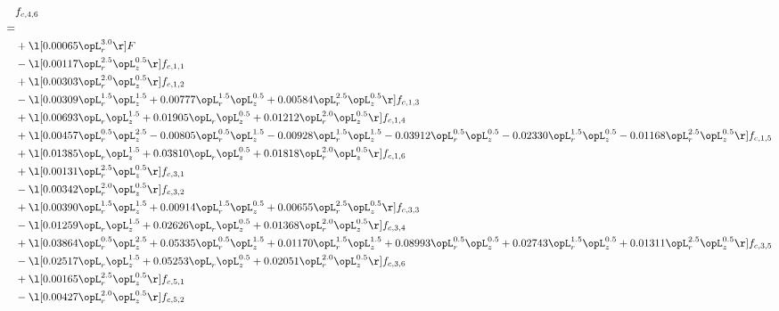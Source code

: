 \begin{alignat}{2} 
\label{eq:f_46_1} 
& f_{c,4,6} \nonumber \\ 
 = \\ 
& + \l[  0.00065 \opL_r^{3.0}  \r] F \nonumber \\ 
& - \l[  0.00117 \opL_r^{2.5} \opL_z^{0.5}  \r] f_{c,1,1} \nonumber \\ 
& + \l[  0.00303 \opL_r^{2.0} \opL_z^{0.5}  \r] f_{c,1,2} \nonumber \\ 
& - \l[  0.00309 \opL_r^{1.5} \opL_z^{1.5} +  0.00777 \opL_r^{1.5} \opL_z^{0.5} +  0.00584 \opL_r^{2.5} \opL_z^{0.5}  \r] f_{c,1,3} \nonumber \\ 
& + \l[  0.00693 \opL_r \opL_z^{1.5} +  0.01905 \opL_r \opL_z^{0.5} +  0.01212 \opL_r^{2.0} \opL_z^{0.5}  \r] f_{c,1,4} \nonumber \\ 
& + \l[  0.00457 \opL_r^{0.5} \opL_z^{2.5}   -0.00805 \opL_r^{0.5} \opL_z^{1.5}   -0.00928 \opL_r^{1.5} \opL_z^{1.5}   -0.03912 \opL_r^{0.5} \opL_z^{0.5}   -0.02330 \opL_r^{1.5} \opL_z^{0.5}   -0.01168 \opL_r^{2.5} \opL_z^{0.5}  \r] f_{c,1,5} \nonumber \\ 
& + \l[  0.01385 \opL_r \opL_z^{1.5} +  0.03810 \opL_r \opL_z^{0.5} +  0.01818 \opL_r^{2.0} \opL_z^{0.5}  \r] f_{c,1,6} \nonumber \\ 
& + \l[  0.00131 \opL_r^{2.5} \opL_z^{0.5}  \r] f_{c,3,1} \nonumber \\ 
& - \l[  0.00342 \opL_r^{2.0} \opL_z^{0.5}  \r] f_{c,3,2} \nonumber \\ 
& + \l[  0.00390 \opL_r^{1.5} \opL_z^{1.5} +  0.00914 \opL_r^{1.5} \opL_z^{0.5} +  0.00655 \opL_r^{2.5} \opL_z^{0.5}  \r] f_{c,3,3} \nonumber \\ 
& - \l[  0.01259 \opL_r \opL_z^{1.5} +  0.02626 \opL_r \opL_z^{0.5} +  0.01368 \opL_r^{2.0} \opL_z^{0.5}  \r] f_{c,3,4} \nonumber \\ 
& + \l[  0.03864 \opL_r^{0.5} \opL_z^{2.5} +  0.05335 \opL_r^{0.5} \opL_z^{1.5} +  0.01170 \opL_r^{1.5} \opL_z^{1.5} +  0.08993 \opL_r^{0.5} \opL_z^{0.5} +  0.02743 \opL_r^{1.5} \opL_z^{0.5} +  0.01311 \opL_r^{2.5} \opL_z^{0.5}  \r] f_{c,3,5} \nonumber \\ 
& - \l[  0.02517 \opL_r \opL_z^{1.5} +  0.05253 \opL_r \opL_z^{0.5} +  0.02051 \opL_r^{2.0} \opL_z^{0.5}  \r] f_{c,3,6} \nonumber \\ 
& + \l[  0.00165 \opL_r^{2.5} \opL_z^{0.5}  \r] f_{c,5,1} \nonumber \\ 
& - \l[  0.00427 \opL_r^{2.0} \opL_z^{0.5}  \r] f_{c,5,2} \nonumber \\ 

\end{alignat}
